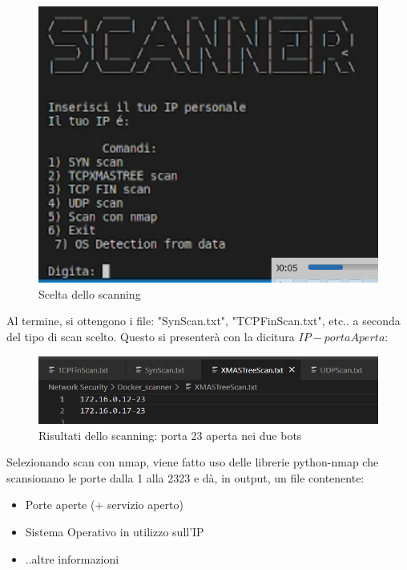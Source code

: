\begin{figure}[H]
    \centering
    \includegraphics[scale=0.6]{UNINA_MSc_Thesis_Project/img/Esecuzione/ScanningChoice.png}
    \caption{Scelta dello scanning}
    \label{fig:my_label}
\end{figure}
Al termine, si ottengono i file: "SynScan.txt", "TCPFinScan.txt", etc.. a seconda del tipo di scan scelto. Questo si presenterà con la dicitura $IP-portaAperta$:

\begin{figure}[H]
    \centering
    \includegraphics[scale=0.8]{UNINA_MSc_Thesis_Project/img/Esecuzione/scannerResults.png}
    \caption{Risultati dello scanning: porta 23 aperta nei due bots}
    \label{fig:my_label}
\end{figure}

Selezionando scan con nmap, viene fatto uso delle librerie python-nmap che scansionano le porte dalla 1 alla 2323 e dà, in output, un file contenente:
\begin{itemize}
    \item Porte aperte (+ servizio aperto)
    \item Sistema Operativo in utilizzo sull'IP
    \item ..altre informazioni
\end{itemize}

